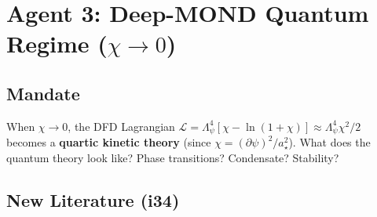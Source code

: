 \documentclass[11pt,a4paper]{article}
\begin{document}
\newpage

\section{Agent 3: Deep-MOND Quantum Regime ($\chi \to 0$)}
\label{sec:agent3}

\subsection{Mandate}

When $\chi \to 0$, the DFD Lagrangian $\mathcal{L} = \Lambda_\psi^4[\chi - \ln(1+\chi)] \approx \Lambda_\psi^4\chi^2/2$ becomes a \textbf{quartic kinetic theory} (since $\chi = (\partial\psi)^2/a_\star^2$). What does the quantum theory look like? Phase transitions? Condensate? Stability?

\subsection{New Literature (i34)}
\end{document}
